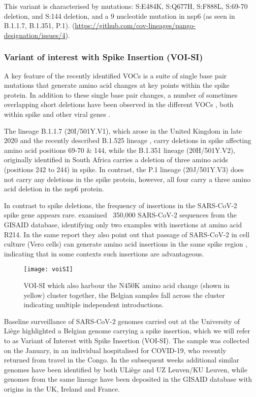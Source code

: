 This variant is characterised by mutations: S:E484K, S:Q677H, S:F888L, S:69-70 deletion, and S:144 deletion, and a 9 nucleotide mutation in nsp6 (as seen in B.1.1.7, B.1.351, P.1). (\url{https://github.com/cov-lineages/pango-designation/issues/4}).

\subsubsection{Variant of interest with Spike Insertion (VOI-SI)}
A key feature of the recently identified VOCs is a suite of single base pair mutations that generate amino acid changes at key points within the spike protein.
In addition to these single base pair changes, a number of sometimes overlapping short deletions have been observed in the different VOCs \citep{garry2021spike}, both within spike and other viral genes \citep{pango4}.

The lineage B.1.1.7 (20I/501Y.V1), which arose in the United Kingdom in late 2020 \citep{rambaut2020preliminary} and the recently described B.1.525 lineage \citep{pango4}, carry deletions in spike affecting amino acid positions 69-70 & 144, while the B.1.351 lineage (20H/501Y.V2), originally identified in South Africa \citep{Tegally2020} carries a deletion of three amino acids (positions 242 to 244) in spike.
In contrast, the P.1 lineage (20J/501Y.V3) \citep{faria2021genomic} does not carry any deletions in the spike protein, however, all four carry a three amino acid deletion in the nsp6 protein.

In contrast to spike deletions, the frequency of insertions in the SARS-CoV-2 spike gene appears rare. \citet{garry2021spike} examined ~350,000 SARS-CoV-2 sequences from the GISAID database, identifying only two examples with insertions at amino acid R214.
In the same report they also point out that passage of SARS-CoV-2 in cell culture (Vero cells) can generate amino acid insertions in the same spike region \citep{garry2021spike}, indicating that in some contexts such insertions are advantageous.

\begin{figure}[ht]
  \centering
  \texttt{[image: voiSI]}
  \caption[VOI-SI monitoring]{VOI-SI which also harbour the N450K amino acid change (shown in yellow) cluster together, the Belgian samples fall across the cluster indicating multiple independent introductions.}
  \label{fig:voiSI}
\end{figure}

Baseline surveillance of SARS-CoV-2 genomes carried out at the University of Li\`{e}ge highlighted a Belgian genome carrying a spike insertion, which we will refer to as Variant of Interest with Spike Insertion (VOI-SI).
The sample was collected on the  January, in an individual hospitalised for COVID-19, who recently returned from travel in the Congo.
In the subsequent weeks additional similar genomes have been identified by both ULi\`{e}ge and UZ Leuven/KU Leuven, while genomes from the same lineage have been deposited in the GISAID database with origins in the UK, Ireland and France.

